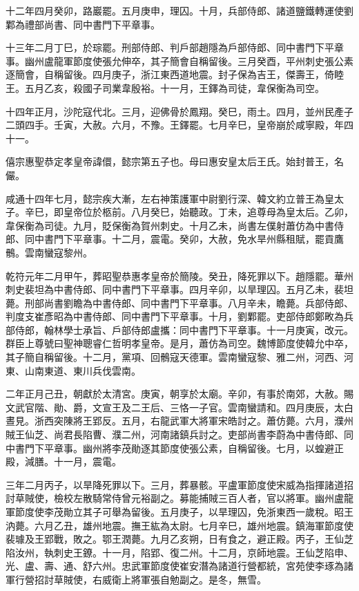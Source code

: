 \begin{pinyinscope}
 十二年四月癸卯，路巖罷。五月庚申，理囚。十月，兵部侍郎、諸道鹽鐵轉運使劉鄴為禮部尚書、同中書門下平章事。



 十三年二月丁巳，於琮罷。刑部侍郎、判戶部趙隱為戶部侍郎、同中書門下平章事。幽州盧龍軍節度使張允伸卒，其子簡會自稱留後。三月癸酉，平州刺史張公素逐簡會，自稱留後。四月庚子，浙江東西道地震。封子保為吉王，傑壽王，倚睦王。五月乙亥，殺國子司業韋殷裕。十一月，王鐸為司徒，韋保衡為司空。



 十四年正月，沙陀寇代北。三月，迎佛骨於鳳翔。癸巳，雨土。四月，並州民產子二頭四手。壬寅，大赦。六月，不豫。王鐸罷。七月辛巳，皇帝崩於咸寧殿，年四十一。



 僖宗惠聖恭定孝皇帝諱儇，懿宗第五子也。母曰惠安皇太后王氏。始封普王，名儼。



 咸通十四年七月，懿宗疾大漸，左右神策護軍中尉劉行深、韓文約立普王為皇太子。辛巳，即皇帝位於柩前。八月癸巳，始聽政。丁未，追尊母為皇太后。乙卯，韋保衡為司徒。九月，貶保衡為賀州刺史。十月乙未，尚書左僕射蕭仿為中書侍郎、同中書門下平章事。十二月，震電。癸卯，大赦，免水旱州縣租賦，罷貢鷹鶻。雲南蠻寇黎州。



 乾符元年二月甲午，葬昭聖恭惠孝皇帝於簡陵。癸丑，降死罪以下。趙隱罷。華州刺史裴坦為中書侍郎、同中書門下平章事。四月辛卯，以旱理囚。五月乙未，裴坦薨。刑部尚書劉瞻為中書侍郎、同中書門下平章事。八月辛未，瞻薨。兵部侍郎、判度支崔彥昭為中書侍郎、同中書門下平章事。十月，劉鄴罷。吏部侍郎鄭畋為兵部侍郎，翰林學士承旨、戶部侍郎盧攜：同中書門下平章事。十一月庚寅，改元。群臣上尊號曰聖神聰睿仁哲明孝皇帝。是月，蕭仿為司空。魏博節度使韓允中卒，其子簡自稱留後。十二月，黨項、回鶻寇天德軍。雲南蠻寇黎、雅二州，河西、河東、山南東道、東川兵伐雲南。



 二年正月己丑，朝獻於太清宮。庚寅，朝享於太廟。辛卯，有事於南郊，大赦。賜文武官階、勛、爵，文宣王及二王后、三恪一子官。雲南蠻請和。四月庚辰，太白晝見。浙西突陳將王郢反。五月，右龍武軍大將軍宋皓討之。蕭仿薨。六月，濮州賊王仙芝、尚君長陷曹、濮二州，河南諸鎮兵討之。吏部尚書李蔚為中書侍郎、同中書門下平章事。幽州將李茂勛逐其節度使張公素，自稱留後。七月，以蝗避正殿，減膳。十一月，震電。



 三年二月丙子，以旱降死罪以下。三月，葬暴骸。平盧軍節度使宋威為指揮諸道招討草賊使，檢校左散騎常侍曾元裕副之。募能捕賊三百人者，官以將軍。幽州盧龍軍節度使李茂勛立其子可舉為留後。五月庚子，以旱理囚，免浙東西一歲稅。昭王汭薨。六月乙丑，雄州地震。撫王紘為太尉。七月辛巳，雄州地震。鎮海軍節度使裴璩及王郢戰，敗之。鄂王潤薨。九月乙亥朔，日有食之，避正殿。丙子，王仙芝陷汝州，執刺史王鐐。十一月，陷郢、復二州。十二月，京師地震。王仙芝陷申、光、盧、壽、通、舒六州。忠武軍節度使崔安潛為諸道行營都統，宮苑使李琢為諸軍行營招討草賊使，右威衛上將軍張自勉副之。是冬，無雪。




\end{pinyinscope}
